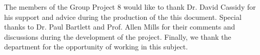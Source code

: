 \documentclass[11pt, english, singlespacing, headsepline,]{FinalReport}
\begin{document}

\begin{acknowledgements}
\addchaptertocentry{\acknowledgementname} %

The members of the Group Project 8 would like to thank Dr. David Cassidy for his support and advice during the production of the this document. Special thanks to Dr. Paul Bartlett and Prof. Allen Mills for their comments and discussions during the development of the project. Finally, we thank the department for the opportunity of working in this subject.  

\end{acknowledgements}


\tableofcontents %








\end{document}
